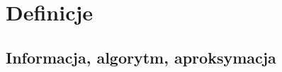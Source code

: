 \documentclass[oik, pdftex, robocza, man]{mgrwms}
\begin{document}
\begin{wstep}[Wprowadzenie]



\end{wstep}


\chapter{Definicje}


\section{Informacja, algorytm, aproksymacja}
\end{document}
